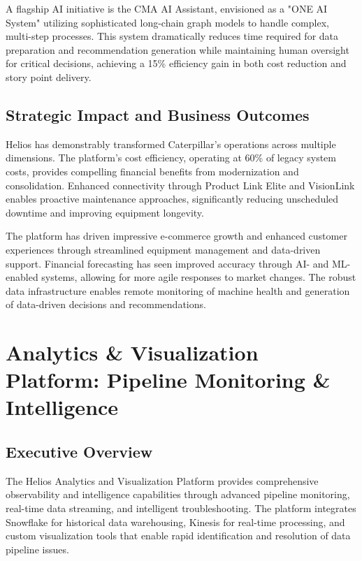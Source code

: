 \documentclass[12pt, a4paper]{article} %
\begin{document}
A flagship AI initiative is the CMA AI Assistant, envisioned as a "ONE AI System" utilizing sophisticated long-chain graph models to handle complex, multi-step processes. This system dramatically reduces time required for data preparation and recommendation generation while maintaining human oversight for critical decisions, achieving a 15\% efficiency gain in both cost reduction and story point delivery.

\subsection{Strategic Impact and Business Outcomes}
Helios has demonstrably transformed Caterpillar's operations across multiple dimensions. The platform's cost efficiency, operating at 60\% of legacy system costs, provides compelling financial benefits from modernization and consolidation. Enhanced connectivity through Product Link Elite and VisionLink enables proactive maintenance approaches, significantly reducing unscheduled downtime and improving equipment longevity.

The platform has driven impressive e-commerce growth and enhanced customer experiences through streamlined equipment management and data-driven support. Financial forecasting has seen improved accuracy through AI- and ML-enabled systems, allowing for more agile responses to market changes. The robust data infrastructure enables remote monitoring of machine health and generation of data-driven decisions and recommendations.


\section{Analytics \& Visualization Platform: Pipeline Monitoring \& Intelligence}

\subsection{Executive Overview}
The Helios Analytics and Visualization Platform provides comprehensive observability and intelligence capabilities through advanced pipeline monitoring, real-time data streaming, and intelligent troubleshooting. The platform integrates Snowflake for historical data warehousing, Kinesis for real-time processing, and custom visualization tools that enable rapid identification and resolution of data pipeline issues.
\end{document}
